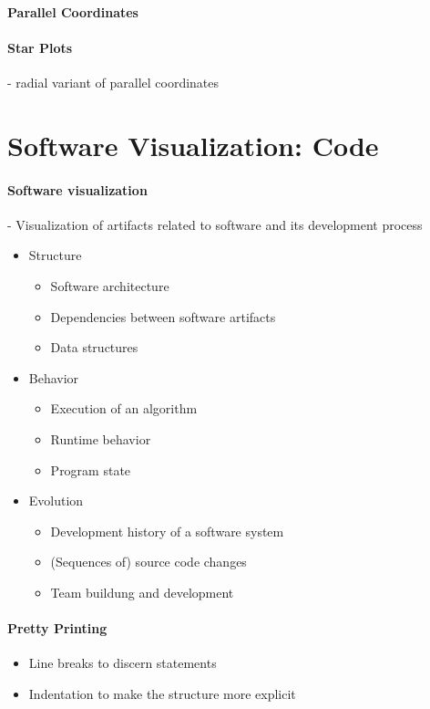 \documentclass[10pt,a4paper]{article}
\begin{document}
		\paragraph{Parallel Coordinates}
		\paragraph{Star Plots} - radial variant of parallel coordinates

\section{Software Visualization: Code}

	\paragraph{Software visualization} - Visualization of artifacts related to software and its development process
	\begin{itemize}
		\item Structure
		\begin{itemize}
			\item Software architecture
			\item Dependencies between software artifacts
			\item Data structures
		\end{itemize}
		\item Behavior
		\begin{itemize}
			\item Execution of an algorithm
			\item Runtime behavior
			\item Program state 
		\end{itemize}
		\item Evolution
		\begin{itemize}
			\item Development history of a software system
			\item (Sequences of) source code changes
			\item Team buildung and development
		\end{itemize}
	\end{itemize}

	\paragraph{Pretty Printing}
	\begin{itemize}
		\item Line breaks to discern statements
		\item Indentation to make the structure more explicit
	\end{itemize}
\end{document}
